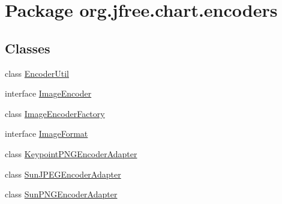 \hypertarget{namespaceorg_1_1jfree_1_1chart_1_1encoders}{}\section{Package org.\+jfree.\+chart.\+encoders}
\label{namespaceorg_1_1jfree_1_1chart_1_1encoders}
\subsection*{Classes}
\begin{DoxyCompactItemize}
\item 
class \mbox{\hyperlink{classorg_1_1jfree_1_1chart_1_1encoders_1_1_encoder_util}{Encoder\+Util}}
\item 
interface \mbox{\hyperlink{interfaceorg_1_1jfree_1_1chart_1_1encoders_1_1_image_encoder}{Image\+Encoder}}
\item 
class \mbox{\hyperlink{classorg_1_1jfree_1_1chart_1_1encoders_1_1_image_encoder_factory}{Image\+Encoder\+Factory}}
\item 
interface \mbox{\hyperlink{interfaceorg_1_1jfree_1_1chart_1_1encoders_1_1_image_format}{Image\+Format}}
\item 
class \mbox{\hyperlink{classorg_1_1jfree_1_1chart_1_1encoders_1_1_keypoint_p_n_g_encoder_adapter}{Keypoint\+P\+N\+G\+Encoder\+Adapter}}
\item 
class \mbox{\hyperlink{classorg_1_1jfree_1_1chart_1_1encoders_1_1_sun_j_p_e_g_encoder_adapter}{Sun\+J\+P\+E\+G\+Encoder\+Adapter}}
\item 
class \mbox{\hyperlink{classorg_1_1jfree_1_1chart_1_1encoders_1_1_sun_p_n_g_encoder_adapter}{Sun\+P\+N\+G\+Encoder\+Adapter}}
\end{DoxyCompactItemize}
